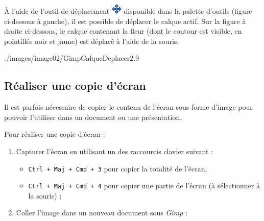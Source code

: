 À l'aide de l'outil de déplacement \includegraphics[width=.4cm]{./images/image02/iconeDeplacement} disponible dans la palette d'outils (figure ci-dessous à gauche), il est possible de déplacer le calque actif. Sur la figure à droite ci-dessous, le calque contenant la fleur (dont le contour est visible, en pointillés noir et jaune) est déplacé à l'aide de la souris. 

%
              {./images/image02/GimpCalqueDeplacer2}{.9\textwidth}






\subsection{Réaliser une copie d'écran}\label{CaptureEcran2}

Il est parfois nécessaire de copier le contenu de l'écran sous forme d'image pour pouvoir l'utiliser dans un document ou une présentation.

\vspace{12pt}

Pour réaliser une copie d'écran :

\begin{enumerate}
\item Capturer l'écran en utilisant un des raccourcis clavier suivant :
        \begin{itemize}
        \item \texttt{Ctrl + Maj + Cmd + 3} pour copier la totalité de l'écran,
        \item \texttt{Ctrl + Maj + Cmd + 4} pour copier une partie de l'écran (à sélectionner à la souris) ;
        \end{itemize} 


\item Coller l'image dans un nouveau document sous \emph{Gimp} : 
\end{enumerate}


